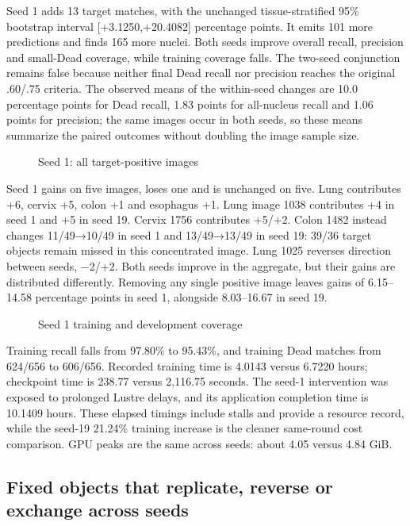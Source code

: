 \documentclass[
  11pt,
]{article}
\begin{document}
Seed 1 adds 13 target matches, with the unchanged tissue-stratified 95\%
bootstrap interval {[}+3.1250,+20.4082{]} percentage points. It emits
101 more predictions and finds 165 more nuclei. Both seeds improve
overall recall, precision and small-Dead coverage, while training
coverage falls. The two-seed conjunction remains false because neither
final Dead recall nor precision reaches the original .60/.75 criteria.
The observed means of the within-seed changes are 10.0 percentage points
for Dead recall, 1.83 points for all-nucleus recall and 1.06 points for
precision; the same images occur in both seeds, so these means summarize
the paired outcomes without doubling the image sample size.

\begin{figure}[H]\centering

\caption{Seed 1: all target-positive images}
\end{figure}

Seed 1 gains on five images, loses one and is unchanged on five. Lung
contributes +6, cervix +5, colon +1 and esophagus +1. Lung image 1038
contributes +4 in seed 1 and +5 in seed 19. Cervix 1756 contributes
+5/+2. Colon 1482 instead changes 11/49→10/49 in seed 1 and 13/49→13/49
in seed 19: 39/36 target objects remain missed in this concentrated
image. Lung 1025 reverses direction between seeds, −2/+2. Both seeds
improve in the aggregate, but their gains are distributed differently.
Removing any single positive image leaves gains of 6.15--14.58
percentage points in seed 1, alongside 8.03--16.67 in seed 19.

\begin{figure}[H]\centering

\caption{Seed 1 training and development coverage}
\end{figure}

Training recall falls from 97.80\% to 95.43\%, and training Dead matches
from 624/656 to 606/656. Recorded training time is 4.0143 versus 6.7220
hours; checkpoint time is 238.77 versus 2,116.75 seconds. The seed-1
intervention was exposed to prolonged Lustre delays, and its application
completion time is 10.1409 hours. These elapsed timings include stalls
and provide a resource record, while the seed-19 21.24\% training
increase is the cleaner same-round cost comparison. GPU peaks are the
same across seeds: about 4.05 versus 4.84 GiB.

\subsection{Fixed objects that replicate, reverse or exchange across
seeds}\label{fixed-objects-that-replicate-reverse-or-exchange-across-seeds}
\end{document}
